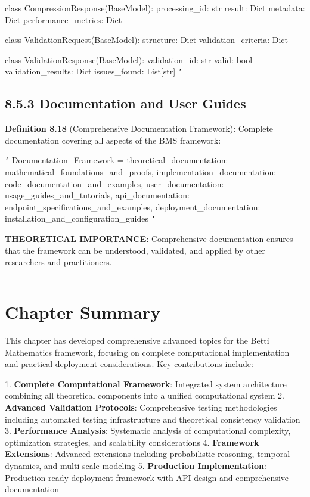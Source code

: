 class CompressionResponse(BaseModel):
    processing_id: str
    result: Dict
    metadata: Dict
    performance_metrics: Dict
    
class ValidationRequest(BaseModel):
    structure: Dict
    validation_criteria: Dict
    
class ValidationResponse(BaseModel):
    validation_id: str
    valid: bool
    validation_results: Dict
    issues_found: List[str]
\texttt{`}

\subsection{8.5.3 Documentation and User Guides}

\textbf{Definition 8.18} (Comprehensive Documentation Framework): Complete documentation covering all aspects of the BMS framework:

\texttt{`}
Documentation_Framework = {
    theoretical_documentation: mathematical_foundations_and_proofs,
    implementation_documentation: code_documentation_and_examples,
    user_documentation: usage_guides_and_tutorials,
    api_documentation: endpoint_specifications_and_examples,
    deployment_documentation: installation_and_configuration_guides
}
\texttt{`}

\textbf{THEORETICAL IMPORTANCE}: Comprehensive documentation ensures that the framework can be understood, validated, and applied by other researchers and practitioners.

\hrule

\section{Chapter Summary}

This chapter has developed comprehensive advanced topics for the Betti Mathematics framework, focusing on complete computational implementation and practical deployment considerations. Key contributions include:

1. \textbf{Complete Computational Framework}: Integrated system architecture combining all theoretical components into a unified computational system
2. \textbf{Advanced Validation Protocols}: Comprehensive testing methodologies including automated testing infrastructure and theoretical consistency validation
3. \textbf{Performance Analysis}: Systematic analysis of computational complexity, optimization strategies, and scalability considerations
4. \textbf{Framework Extensions}: Advanced extensions including probabilistic reasoning, temporal dynamics, and multi-scale modeling
5. \textbf{Production Implementation}: Production-ready deployment framework with API design and comprehensive documentation

